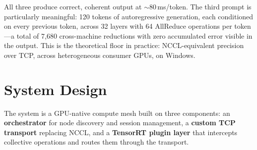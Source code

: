 \documentclass[10pt,twocolumn]{article}
\begin{document}
All three produce correct, coherent output at $\sim$80\,ms/token.  The
third prompt is particularly meaningful: 120 tokens of autoregressive
generation, each conditioned on every previous token, across 32 layers
with 64 AllReduce operations per token---a total of 7,680 cross-machine
reductions with zero accumulated error visible in the output.  This is the
theoretical floor in practice: NCCL-equivalent precision over TCP, across
heterogeneous consumer GPUs, on Windows.

\section{System Design}\label{sec:system}

The system is a GPU-native compute mesh built on three components: an
\textbf{orchestrator} for node discovery and session management, a
\textbf{custom TCP transport} replacing NCCL, and a \textbf{TensorRT
plugin layer} that intercepts collective operations and routes them through
the transport.
\end{document}
